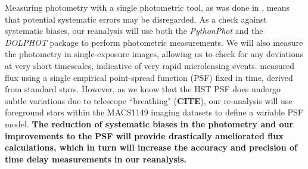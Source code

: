Measuring photometry with a single photometric tool, as was done in \cite{Rodney:2016}, means that potential systematic errors may be disregarded. 
As a check against systematic biases, our reanalysis will use both the \textit{PythonPhot} and the \textit{DOLPHOT} package to 
perform photometric measurements. We will also measure the photometry in single-exposure images, allowing us to check for any deviations 
at very short timescales, indicative of very rapid microlensing events. \cite{Rodney:2016} measured flux using a single empirical 
point-spread function (PSF) fixed in time, derived from standard stars. However, as we know that the HST PSF does undergo 
subtle variations due to telescope ``breathing" (\textbf{CITE}), our re-analysis will use foreground stars within the MACS1149 imaging 
datasets to define a variable PSF model. \textbf{The reduction of systematic biases in the photometry and our improvements to the 
PSF will provide drastically ameliorated flux calculations, which in turn will increase the accuracy and precision of time delay 
measurements in our reanalysis.}




